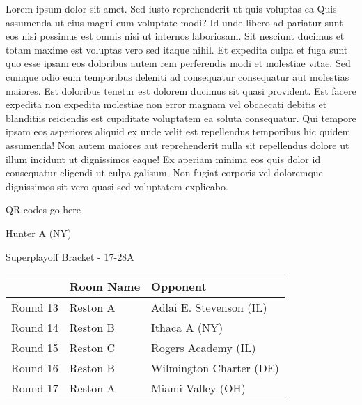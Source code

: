 \documentclass{article}%
\begin{document}
\vspace*{8pt}%
\linebreak%
\newline%
\newline%
Lorem ipsum dolor sit amet. Sed iusto reprehenderit ut quis voluptas ea Quis assumenda ut eius magni eum voluptate modi? Id unde libero ad pariatur sunt eos nisi possimus est omnis nisi ut internos laboriosam. Sit nesciunt ducimus et totam maxime est voluptas vero sed itaque nihil. Et expedita culpa et fuga sunt quo esse ipsam eos doloribus autem rem perferendis modi et molestiae vitae.\newline%
\newline%
Sed cumque odio eum temporibus deleniti ad consequatur consequatur aut molestias maiores. Est doloribus tenetur est dolorem ducimus sit quasi provident. Est facere expedita non expedita molestiae non error magnam vel obcaecati debitis et blanditiis reiciendis est cupiditate voluptatem ea soluta consequatur. Qui tempore ipsam eos asperiores aliquid ex unde velit est repellendus temporibus hic quidem assumenda!\newline%
\newline%
Non autem maiores aut reprehenderit nulla sit repellendus dolore ut illum incidunt ut dignissimos eaque! Ex aperiam minima eos quis dolor id consequatur eligendi ut culpa galisum. Non fugiat corporis vel doloremque dignissimos sit vero quasi sed voluptatem explicabo.\newline%
\newline%
%
\vspace*{30pt}%
\begin{center}%
\begin{Huge}%
QR codes go here%
\end{Huge}%
\end{center}%
\newpage%
\begin{center}%
\begin{Huge}%
Hunter A (NY)%
\end{Huge}%
\vspace*{8pt}%
\linebreak%
\begin{Large}%
Superplayoff Bracket {-} 17{-}28A%
\end{Large}%
\end{center}%
%
\begin{tabularx}{\textwidth}{|c|Y|Y|}%
\hline%
&Room Name&Opponent\\%
\hline%
Round 13&Reston A&Adlai E. Stevenson (IL)\\%
Round 14&Reston B&Ithaca A (NY)\\%
Round 15&Reston C&Rogers Academy (IL)\\%
Round 16&Reston B&Wilmington Charter (DE)\\%
Round 17&Reston A&Miami Valley (OH)\\%
\hline%
\end{tabularx}%
\end{document}
